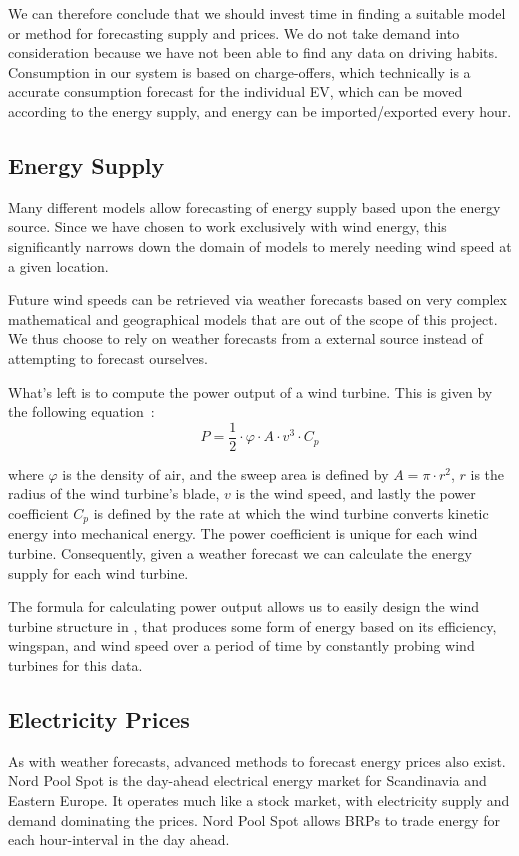 We can therefore conclude that we should invest time in finding a suitable model or method for forecasting supply and prices. We do not take demand into consideration because we have not been able to find any data on driving habits. Consumption in our system is based on charge-offers, which technically is a  accurate consumption forecast for the individual EV, which can be moved according to the energy supply, and energy can be imported/exported every hour.

\subsection{Energy Supply}\label{sub:Forecasting: Energy supply}
Many different models allow forecasting of energy supply based upon the energy source. Since we have chosen to work exclusively with wind energy, this significantly narrows down the domain of models to merely needing wind speed at a given location.

Future wind speeds can be retrieved via weather forecasts based on very complex mathematical and geographical models that are out of the scope of this project. We thus choose to rely on weather forecasts from a external source instead of attempting to forecast ourselves.

What's left is to compute the power output of a wind turbine. This is given by the following equation~\cite{RAENGWIND}:
\[
  P = \frac{1}{2} \cdot \varphi \cdot A \cdot v^3 \cdot C_{p}
\]

where $\varphi$ is the density of air, and the sweep area is defined by $A = \pi \cdot r^{2}$, $r$ is the radius of the wind turbine's blade, $v$ is the wind speed, and lastly the power coefficient $C_p$ is defined by the rate at which the wind turbine converts kinetic energy into mechanical energy. The power coefficient is unique for each wind turbine. Consequently, given a weather forecast we can calculate the energy supply for each wind turbine.

The formula for calculating power output allows us to easily design the wind turbine structure in , that produces some form of energy based on its efficiency, wingspan, and wind speed over a period of time by constantly probing wind turbines for this data.

\subsection{Electricity Prices}\label{sub:forecasting_energy_pricing}
As with weather forecasts, advanced methods to forecast energy prices also exist. Nord Pool Spot is the day-ahead electrical energy market for Scandinavia and Eastern Europe. It operates much like a stock market, with electricity supply and demand dominating the prices. Nord Pool Spot allows BRPs to trade energy for each hour-interval in the day ahead.

